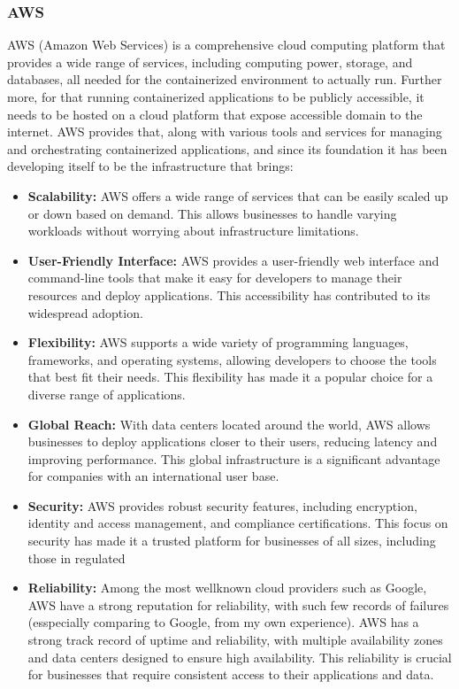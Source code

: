 \subsubsection*{AWS}
AWS (Amazon Web Services) is a comprehensive cloud computing platform that provides a wide range of services, including computing power, storage, and databases, all needed for the containerized environment to actually run. Further more, for that running containerized applications to be publicly accessible, it needs to be hosted on a cloud platform that expose accessible domain to the internet. AWS provides that, along with various tools and services for managing and orchestrating containerized applications, and since its foundation it has been developing itself to be the infrastructure that brings:

\begin{itemize}
    \item \textbf{Scalability:} AWS offers a wide range of services that can be easily scaled up or down based on demand. This allows businesses to handle varying workloads without worrying about infrastructure limitations.
    \item \textbf{User-Friendly Interface:} AWS provides a user-friendly web interface and command-line tools that make it easy for developers to manage their resources and deploy applications. This accessibility has contributed to its widespread adoption.
    \item \textbf{Flexibility:} AWS supports a wide variety of programming languages, frameworks, and operating systems, allowing developers to choose the tools that best fit their needs. This flexibility has made it a popular choice for a diverse range of applications.
    \item \textbf{Global Reach:} With data centers located around the world, AWS allows businesses to deploy applications closer to their users, reducing latency and improving performance. This global infrastructure is a significant advantage for companies with an international user base.
    \item \textbf{Security:} AWS provides robust security features, including encryption, identity and access management, and compliance certifications. This focus on security has made it a trusted platform for businesses of all sizes, including those in regulated
    \item \textbf{Reliability:} Among the most well\-known cloud providers such as Google, AWS have a strong reputation for reliability, with such few records of failures (esspecially comparing to Google, from my own experience). AWS has a strong track record of uptime and reliability, with multiple availability zones and data centers designed to ensure high availability. This reliability is crucial for businesses that require consistent access to their applications and data.
\end{itemize}
